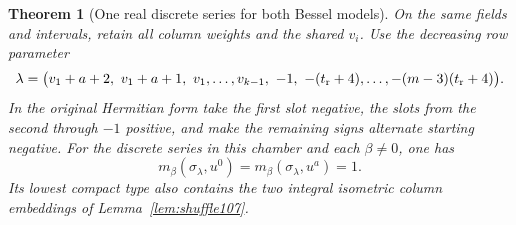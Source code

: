 \documentclass[a4paper,11pt]{article}
\newtheorem{theorem}[proposition]{Theorem}
\theoremstyle{definition}
\theoremstyle{remark}
\numberwithin{equation}{section}
\begin{document}
\begin{theorem}[One real discrete series for both Bessel models]\label{thm:real108}
On the same fields and intervals, retain all column weights and
the shared \(v_i\). Use the decreasing row parameter
\begin{equation}
 \lambda=\big(v_1+a+2,\ v_1+a+1,\ v_1,\ldots,v_{k-1},\
        -1,\ -(t_{\rm r}+4),\ldots,-(m-3)(t_{\rm r}+4)\big).
 \label{eq:list108}
\end{equation}
In the original Hermitian form take the first slot negative,
the slots from the second through \(-1\) positive, and make the
remaining signs alternate starting negative. For the discrete
series in this chamber and each \(\beta\ne0\), one has
\[
       m_\beta(\sigma_\lambda,u^0)
       =m_\beta(\sigma_\lambda,u^a)=1 .
\]
Its lowest compact type also contains the two integral isometric
column embeddings of Lemma~\ref{lem:shuffle107}.
\end{theorem}
\end{document}
